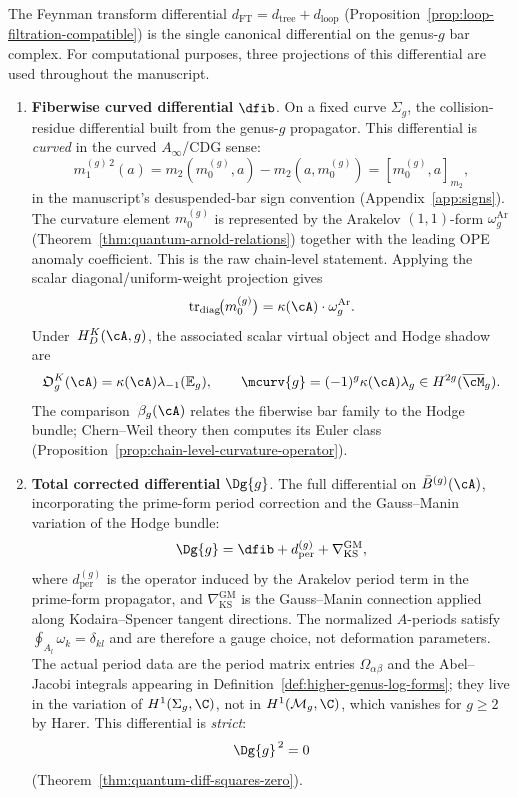\begin{convention}\label{conv:higher-genus-differentials}
The Feynman transform differential
$d_{\mathrm{FT}} = d_{\mathrm{tree}} + d_{\mathrm{loop}}$
\textup{(}Proposition~\textup{\ref{prop:loop-filtration-compatible})} is
the single canonical differential on the genus-$g$ bar complex. For
computational purposes, three projections of this differential are
used throughout the manuscript.
\begin{enumerate}
\item[\textup{(i)}] \textbf{Fiberwise curved differential} $\dfib$.
 On a fixed curve $\Sigma_g$, the collision-residue differential built
 from the genus-$g$ propagator. This differential is \emph{curved} in
 the curved $A_\infty$/CDG sense:
 \[
  m_1^{(g)\,2}(a)
  =
  m_2(m_0^{(g)},a)-m_2(a,m_0^{(g)})
  =
  [m_0^{(g)},a]_{m_2},
 \]
 in the manuscript's desuspended-bar sign convention
 (Appendix~\ref{app:signs}). The curvature element
 $m_0^{(g)}$ is represented by the Arakelov $(1,1)$-form
 $\omega_g^{\mathrm{Ar}}$
 (Theorem~\ref{thm:quantum-arnold-relations}) together with the
 leading OPE anomaly coefficient. This is the raw chain-level
 statement.  Applying the scalar
 diagonal/uniform-weight projection gives
 \[
  \operatorname{tr}_{\mathrm{diag}}\!\bigl(m_0^{(g)}\bigr)
  =
  \kappa(\cA)\cdot\omega_g^{\mathrm{Ar}} .
 \]
 Under~$H_D^K(\cA,g)$, the associated scalar virtual object and
 Hodge shadow are
 \[
  \mathfrak O_g^K(\cA)
  =\kappa(\cA)\lambda_{-1}(\mathbb E_g),
  \qquad
  \mcurv{g}
  =(-1)^g\kappa(\cA)\lambda_g
  \in H^{2g}(\overline{\cM}_g).
 \]
 The comparison~$\beta_g(\cA)$ relates the fiberwise bar family to
 the Hodge bundle; Chern--Weil theory then computes its Euler class
 (Proposition~\ref{prop:chain-level-curvature-operator}).

\item[\textup{(ii)}] \textbf{Total corrected differential} $\Dg{g}$.
 The full differential on $\bar{B}^{(g)}(\cA)$, incorporating the
 prime-form period correction and the Gauss--Manin variation of the
 Hodge bundle:
 \[
 \Dg{g}
 =
 \dfib + d_{\mathrm{per}}^{(g)} + \nabla_{\mathrm{KS}}^{\mathrm{GM}},
 \]
 where $d_{\mathrm{per}}^{(g)}$ is the operator induced by the
 Arakelov period term in the prime-form propagator, and
 $\nabla_{\mathrm{KS}}^{\mathrm{GM}}$ is the Gauss--Manin connection
 applied along Kodaira--Spencer tangent directions. The normalized
 $A$-periods satisfy
 $\oint_{A_l}\omega_k=\delta_{kl}$ and are therefore a gauge choice,
 not deformation parameters. The actual period data are the period
 matrix entries $\Omega_{\alpha\beta}$ and the Abel--Jacobi integrals
 appearing in Definition~\ref{def:higher-genus-log-forms}; they live
 in the variation of $H^1(\Sigma_g,\C)$, not in
 $H^1(\mathcal{M}_g,\C)$, which vanishes for $g\ge2$ by Harer.
 This differential is
 \emph{strict}:
 \[
 \Dg{g}^{\,2} = 0
 \]
 \textup{(}Theorem~\textup{\ref{thm:quantum-diff-squares-zero})}.


\end{enumerate}
\end{convention}
